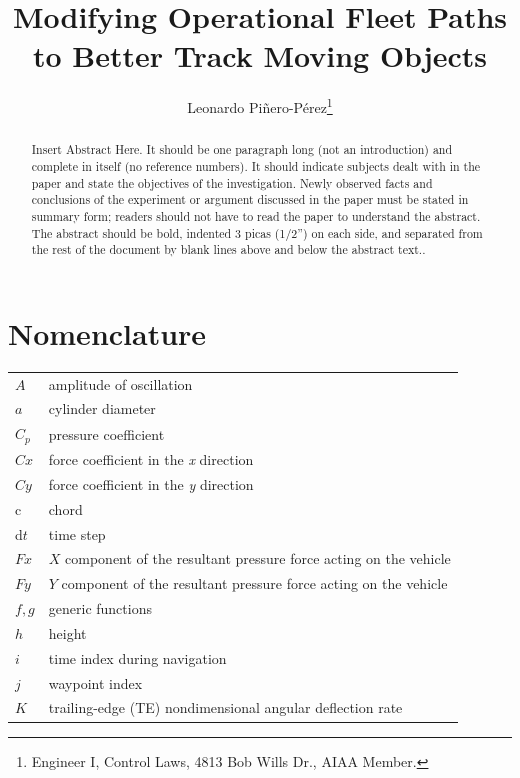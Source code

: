 \documentclass[conf]{new-aiaa}
\title{Modifying Operational Fleet Paths to Better Track Moving Objects}
\author{Leonardo Pi{\~{n}}ero-P{\'{e}}rez\footnote{Engineer I, Control Laws, 4813 Bob Wills Dr., AIAA Member.}}
\affil{Bell Flight, Arlington, TX, 76019}
\begin{document}
\maketitle

\begin{abstract}
Insert Abstract Here. It should be one paragraph long (not an introduction) and complete in itself (no reference numbers). It should indicate subjects dealt with in the paper and state the objectives of the investigation. Newly observed facts and conclusions of the experiment or argument discussed in the paper must be stated in summary form; readers should not have to read the paper to understand the abstract. The abstract should be bold, indented 3 picas (1/2'') on each side, and separated from the rest of the document by blank lines above and below the abstract text..
\end{abstract}

\section{Nomenclature}

{\renewcommand\arraystretch{1.0}
\noindent\begin{longtable*}{@{}l @{\quad=\quad} l@{}}
$A$  & amplitude of oscillation \\
$a$ &    cylinder diameter \\
$C_p$& pressure coefficient \\
$Cx$ & force coefficient in the \textit{x} direction \\
$Cy$ & force coefficient in the \textit{y} direction \\
c   & chord \\
d$t$ & time step \\
$Fx$ & $X$ component of the resultant pressure force acting on the vehicle \\
$Fy$ & $Y$ component of the resultant pressure force acting on the vehicle \\
$f, g$   & generic functions \\
$h$  & height \\
$i$  & time index during navigation \\
$j$  & waypoint index \\
$K$  & trailing-edge (TE) nondimensional angular deflection rate
\end{longtable*}}

\end{document}
